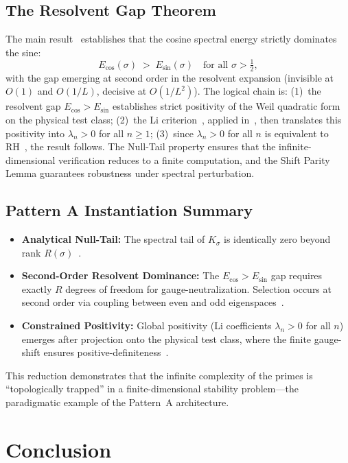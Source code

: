 \documentclass[12pt,a4paper]{article}
\theoremstyle{definition}
\theoremstyle{remark}
\begin{document}
\subsection{The Resolvent Gap Theorem}

The main result~\cite{Geiger2026b,Geiger2026c} establishes that the cosine spectral energy strictly dominates the sine:
\[
E_{\cos}(\sigma) \;>\; E_{\sin}(\sigma) \quad \text{for all } \sigma > \tfrac{1}{2},
\]
with the gap emerging at second order in the resolvent expansion (invisible at $O(1)$ and $O(1/L)$, decisive at $O(1/L^2)$). The logical chain is: (1)~the resolvent gap $E_{\cos} > E_{\sin}$ establishes strict positivity of the Weil quadratic form on the physical test class; (2)~the Li criterion~\cite{Li1997}, applied in~\cite{Geiger2026c}, then translates this positivity into $\lambda_n > 0$ for all $n \ge 1$; (3)~since $\lambda_n > 0$ for all $n$ is equivalent to RH~\cite{Li1997}, the result follows. The Null-Tail property ensures that the infinite-dimensional verification reduces to a finite computation, and the Shift Parity Lemma guarantees robustness under spectral perturbation.

\subsection{Pattern A Instantiation Summary}

\begin{itemize}
    \item \textbf{Analytical Null-Tail:} The spectral tail of $K_\sigma$ is identically zero beyond rank $R(\sigma)$~\cite{Geiger2026a}.
    \item \textbf{Second-Order Resolvent Dominance:} The $E_{\cos} > E_{\sin}$ gap requires exactly $R$ degrees of freedom for gauge-neutralization. Selection occurs at second order via coupling between even and odd eigenspaces~\cite{Geiger2026b}.
    \item \textbf{Constrained Positivity:} Global positivity (Li coefficients $\lambda_n > 0$ for all $n$) emerges after projection onto the physical test class, where the finite gauge-shift ensures positive-definiteness~\cite{Geiger2026c}.
\end{itemize}
This reduction demonstrates that the infinite complexity of the primes is ``topologically trapped'' in a finite-dimensional stability problem---the paradigmatic example of the Pattern~A architecture.

\section{Conclusion}
\end{document}
